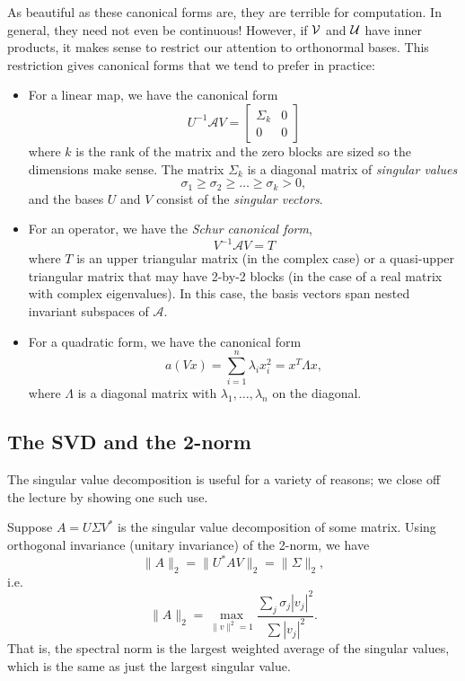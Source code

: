 \documentclass[12pt, leqno]{article} %
\begin{document}
As beautiful as these canonical forms are, they are terrible for
computation.  In general, they need not even be continuous!
However, if $\cal{V}$ and $\cal{U}$ have inner products, it makes
sense to restrict our attention to orthonormal bases.  This
restriction gives canonical forms that we tend to prefer in practice:
\begin{itemize}
\item For a linear map, we have the canonical form
  \[
    U^{-1} \mathcal{A} V = \begin{bmatrix} \Sigma_k & 0 \\ 0 & 0 \end{bmatrix}
  \]
  where $k$ is the rank of the matrix and the zero blocks are sized
  so the dimensions make sense.  The matrix $\Sigma_k$ is a diagonal
  matrix of {\em singular values}
  \[
    \sigma_1 \geq \sigma_2 \geq \ldots \geq \sigma_k > 0,
  \]
  and the bases $U$ and $V$ consist of the {\em singular vectors}.  
\item For an operator, we have the {\em Schur canonical form},
  \[
    V^{-1} \mathcal{A} V = T
  \]
  where $T$ is an upper triangular matrix (in the complex case) or
  a quasi-upper triangular matrix that may have 2-by-2 blocks
  (in the case of a real matrix with complex eigenvalues).
  In this case, the basis vectors span nested invariant subspaces
  of $\mathcal{A}$.
\item For a quadratic form, we have the canonical form
  \[
    a(Vx) = \sum_{i=1}^{n} \lambda_i x_i^2 = x^T \Lambda x,
  \]
  where $\Lambda$ is a diagonal matrix with $\lambda_1, \ldots,
  \lambda_n$ on the diagonal.
\end{itemize}


\subsection{The SVD and the 2-norm}

The singular value decomposition is useful for a variety of reasons;
we close off the lecture by showing one such use.

Suppose $A = U \Sigma V^*$ is the singular value decomposition of some
matrix.  Using orthogonal invariance (unitary invariance) of the
2-norm, we have
\[
  \|A\|_2 = \|U^* A V\|_2 = \|\Sigma\|_2,
\]
i.e.~
\[
  \|A\|_2 = \max_{\|v\|^2 = 1} \frac{\sum_j \sigma_j |v_j|^2}{\sum |v_j|^2}.
\]
That is, the spectral norm is the largest weighted average of the
singular values, which is the same as just the largest singular value.
\end{document}
